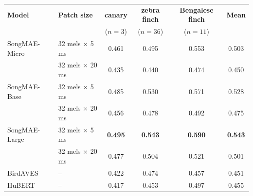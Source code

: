 \nopagebreak[4]
\vspace{0.5\baselineskip}

\label{tab:4} %

\nopagebreak[4]
\vspace{0.5\baselineskip}

\begingroup
\setlength{\tabcolsep}{4pt}
\centering
\small
{}
\begin{tabular}{@{}ll*{4}{S[table-format=1.3]}@{}}
\toprule
\textbf{Model} & \textbf{Patch size} & {\textbf{canary}} & {\textbf{zebra finch}} & {\textbf{Bengalese finch}} & {\textbf{Mean}} \\
& & {($n=3$)} & {($n=36$)} & {($n=11$)} & {} \\
\midrule
SongMAE-Micro & 32 mels × 5 ms & 0.461 & 0.495 & 0.553 & 0.503 \\
 & 32 mels × 20 ms & 0.435 & 0.440 & 0.474 & 0.450 \\
\addlinespace
SongMAE-Base & 32 mels × 5 ms & 0.485 & 0.530 & 0.571 & 0.528 \\
 & 32 mels × 20 ms & 0.456 & 0.478 & 0.492 & 0.475 \\
\addlinespace
SongMAE-Large & 32 mels × 5 ms & \textbf{0.495} & \textbf{0.543} & \textbf{0.590} & \textbf{0.543} \\
 & 32 mels × 20 ms & 0.477 & 0.504 & 0.521 & 0.501 \\
\addlinespace
BirdAVES & -- & 0.422 & 0.474 & 0.457 & 0.451 \\
HuBERT & -- & 0.417 & 0.453 & 0.497 & 0.455 \\
\bottomrule
\end{tabular}
\par
\endgroup
\addvspace{\baselineskip}
